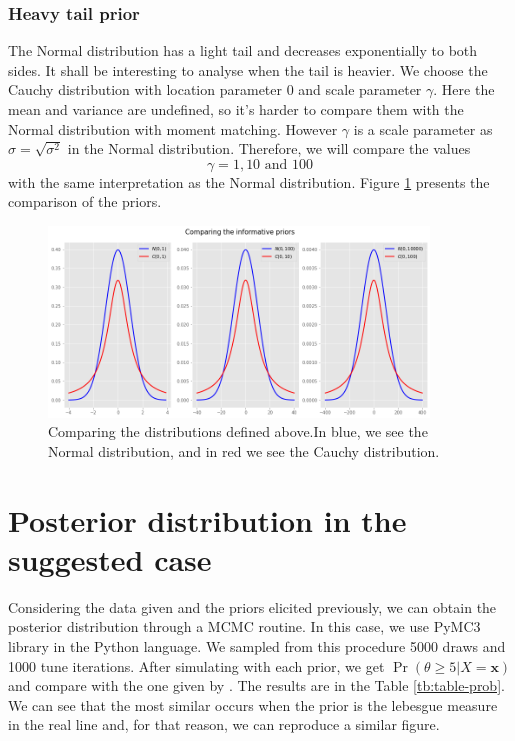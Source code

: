 \documentclass[a4paper,10pt, notitlepage]{report}
\theoremstyle{plain}
\newcommand{\pr}{\operatorname{Pr}} %
\newcommand{\bx}{\boldsymbol{x}} %
\begin{document}
\subsubsection*{Heavy tail prior}

The Normal distribution has a light tail and decreases exponentially to both
sides. It shall be interesting to analyse when the tail is heavier. We choose
the Cauchy distribution with location parameter 0 and scale parameter
$\gamma$. Here the mean and variance are undefined, so it's harder to compare
them with the Normal distribution with moment matching. However $\gamma$ is a scale parameter as $\sigma = \sqrt{\sigma^2}$ in
the Normal distribution. Therefore, we
will compare the values 
$$
\gamma = 1, 10 \text{ and } 100
$$
with the same interpretation as the Normal distribution. Figure
\ref{fig:comparison-priors} presents the comparison of the priors. 

\begin{figure}
    \centering
    \includegraphics[width=0.9\textwidth]{../../images/priors-comparison.png}
    \caption{Comparing the distributions defined above.In blue, we see the Normal distribution, and in red we see the Cauchy distribution.}
    \label{fig:comparison-priors}
\end{figure}

\section*{Posterior distribution in the suggested case}

Considering the data given and the priors elicited previously, we can
obtain the posterior distribution through a MCMC routine. In this case, we use
PyMC3 library \cite[]{pymc3} in the Python language. We sampled from this
procedure 5000 draws and 1000 tune iterations. After simulating with each prior,
we get $\pr(\theta \ge 5 | X = \bx)$ and compare with the one given by
\cite[]{schervish1996theory}. The results are in the Table \ref{tb:table-prob}.
We can see that the most similar occurs when the prior is the lebesgue measure
in the real line and, for that reason, we can reproduce a similar figure. 
\end{document}
